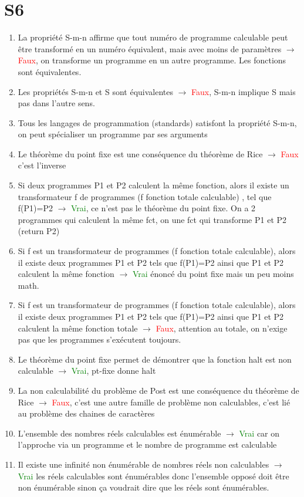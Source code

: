 \documentclass{report}
\begin{document}
\section{S6}
\begin{enumerate}
\item La propriété S-m-n affirme que tout numéro de programme calculable peut être transformé en un numéro équivalent, mais avec moins de paramètres $\rightarrow$ \textcolor{red}{Faux}, on transforme un programme en un autre programme. Les fonctions sont équivalentes.
\item Les propriétés S-m-n et S  sont équivalentes $\rightarrow$ \textcolor{red}{Faux}, S-m-n implique S mais pas dans l'autre sens.
\item Tous les langages de programmation (standards) satisfont la propriété S-m-n, on peut spécialiser un programme par ses arguments
\item Le théorème du point fixe est une conséquence du théorème de Rice $\rightarrow$ \textcolor{red}{Faux} c'est l'inverse
\item Si deux programmes P1 et P2 calculent la même fonction, alors il existe un transformateur f de programmes (f  fonction totale calculable) , tel que f(P1)=P2 $\rightarrow$ \textcolor{green}{Vrai}, ce n'est pas le théorème du point fixe. On a 2 programmes qui calculent la même fct, on une fct qui transforme P1 et P2 (return P2)
\item Si f est un transformateur de programmes (f  fonction totale calculable),  alors il existe deux programmes P1 et P2 tels que f(P1)=P2 ainsi que  P1 et P2 calculent la même fonction $\rightarrow$ \textcolor{green}{Vrai} énoncé du point fixe mais un peu moins math.
\item Si f est un transformateur de programmes (f  fonction totale calculable),  alors il existe deux programmes P1 et P2 tels que f(P1)=P2 ainsi que  P1 et P2 calculent la même fonction totale $\rightarrow$ \textcolor{red}{Faux}, attention au totale, on n'exige pas que les programmes s'exécutent toujours.
\item Le théorème du point fixe permet de démontrer que la fonction halt  est non calculable $\rightarrow$ \textcolor{green}{Vrai}, pt-fixe donne halt
\item La non calculabilité du problème de Post est une conséquence du théorème de Rice $\rightarrow$ \textcolor{red}{Faux}, c'est une autre famille de problème non calculables, c'est lié au problème des chaines de caractères
\item L’ensemble des nombres réels calculables est énumérable $\rightarrow$ \textcolor{green}{Vrai} car on l'approche via un programme et le nombre de programme est calculable
\item Il existe une infinité non énumérable de nombres réels non calculables $\rightarrow$  \textcolor{green}{Vrai} les réels calculables sont énumérables donc l'ensemble opposé doit être non énumérable sinon ça voudrait dire que les réels sont énumérables.
\end{enumerate}
\end{document}
